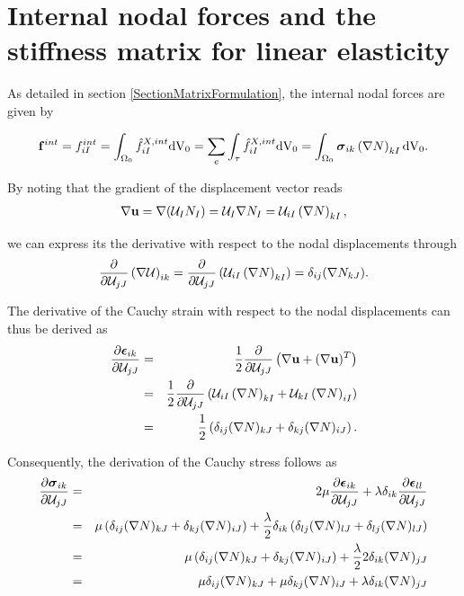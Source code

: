 \section{Internal nodal forces and the stiffness matrix for linear elasticity} \label{ANodalForces}

As detailed in section \ref{SectionMatrixFormulation}, the internal nodal forces are given by

\begin{eqnarray}
\mathbf f ^{int} = f ^{int}_{iI}  = \int _{\Omega _0}  \hat{f} ^{X,int}_{iI}   \textnormal{dV}_0 = \sum_{e} \int _{\tau}  \hat{f} ^{X,int}_{iI}   \textnormal{dV}_0 = \int _{\Omega _0}  \boldsymbol{\sigma}_{ik}  \left( \nabla N \right)_{kI}  \textnormal{dV}_0.
\end{eqnarray}

By noting that the gradient of the displacement vector reads
\begin{eqnarray}
\nabla \mathbf {u}  = \nabla (\mathcal{U}  _I N_I  ) =  \mathcal{U}  _I \nabla N_I  = \mathcal{U}  _{iI} \left( \nabla N \right)_{kI},
\end{eqnarray}

we can express its the derivative with respect to the nodal displacements through
\begin{eqnarray}
\frac{\partial}{\partial \mathcal{U}  _{jJ}} \left( \nabla \mathcal{U}  \right)_{ik}  = \frac{\partial}{\partial \mathcal{U}  _{jJ}} \left( \mathcal{U}  _{iI} \left( \nabla N \right)_{kI} \right) = \delta _{ij} (\nabla N_{kJ}).
\end{eqnarray}


The derivative of the Cauchy strain with respect to the nodal displacements can thus be derived as
\begin{eqnarray}
\frac{\partial \boldsymbol{\epsilon} _{ik}}{\partial \mathcal{U}  _{jJ}} &=& \frac{1}{2} \frac{\partial}{\partial \mathcal{U}  _{jJ}} \left( \nabla \mathbf {u}  + (\nabla \mathbf {u}  )^T \right) \notag \\
&=& \frac{1}{2} \frac{\partial}{\partial \mathcal{U}  _{jJ}} \left(  \mathcal{U}  _{iI} \left( \nabla N \right)_{kI}  + \mathcal{U}  _{kI} \left( \nabla N \right)_{iI} \right) \notag \\
&=& \frac{1}{2}  \left( \delta _{ij} (\nabla N)_{kJ} + \delta _{kj} (\nabla N)_{iJ} \right).
\end{eqnarray}

Consequently, the derivation of the Cauchy stress follows as
\begin{eqnarray}
\frac{\partial \boldsymbol{\sigma} _{ik}}{\partial \mathcal{U}  _{jJ}} &=& 2\mu \frac{\partial \boldsymbol{\epsilon}_{ik}}{\partial \mathcal{U}  _{jJ}} + \lambda \delta _{ik} \frac{\partial \boldsymbol{\epsilon}_{ll}}{\partial \mathcal{U}  _{jJ}} \notag \\
&=& \mu \left( \delta _{ij} (\nabla N)_{kJ} + \delta _{kj} (\nabla N)_{iJ} \right) + \frac{\lambda}{2}  \delta _{ik} \left( \delta _{lj} (\nabla N)_{lJ} + \delta _{lj} (\nabla N)_{lJ} \right) \notag \\
&=& \mu \left( \delta _{ij} (\nabla N)_{kJ} + \delta _{kj} (\nabla N)_{iJ} \right) + \frac{\lambda}{2} 2 \delta _{ik} (\nabla N)_{jJ} \notag \\
&=& \mu \delta _{ij} (\nabla N)_{kJ} + \mu \delta _{kj} (\nabla N)_{iJ}  + \lambda \delta _{ik} (\nabla N)_{jJ} 
\end{eqnarray}

